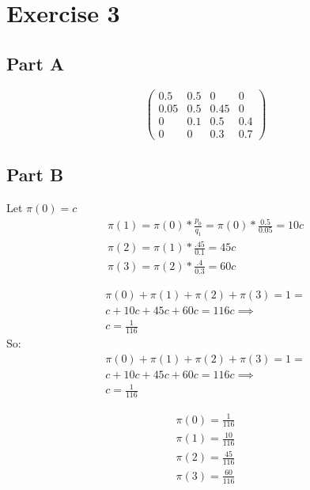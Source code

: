 \documentclass{article}\usepackage[]{graphicx}\usepackage[]{color}
\begin{document}
\section*{Exercise 3}
\subsection*{Part A}
\begin{equation}
\left(\begin{array}{cccc}
0.5 & 0.5 & 0 & 0\\
0.05 & 0.5 & 0.45 & 0\\
0 & 0.1 & 0.5 & 0.4\\
0 & 0 & 0.3 & 0.7
\end{array}\right)
\end{equation}

\subsection*{Part B}
Let $\pi(0) = c$
\begin{equation}
\begin{split}
\pi(1) = \pi(0)*\frac{p_{0}}{q_{1}}=\pi(0)*\frac{0.5}{0.05} = 10c \\
\pi(2) = \pi(1)*\frac{.45}{0.1}=45c \\
\pi(3) = \pi(2)*\frac{.4}{0.3}=60c
\end{split}
\end{equation}

\begin{equation}
\begin{split}
\pi(0)+\pi(1)+\pi(2)+\pi(3)=1= \\
c+10c+45c+60c = 116c \implies \\
c=\frac{1}{116}
\end{split}
\end{equation}
So:
\begin{equation}
\begin{split}
\pi(0)+\pi(1)+\pi(2)+\pi(3)=1= \\
c+10c+45c+60c = 116c \implies \\
c=\frac{1}{116}
\end{split}
\end{equation}

\begin{equation}
\begin{split}
\pi(0) = \frac{1}{116}\\
\pi(1) = \frac{10}{116}\\
\pi(2) = \frac{45}{116}\\
\pi(3) = \frac{60}{116}
\end{split}
\end{equation}
\end{document}
